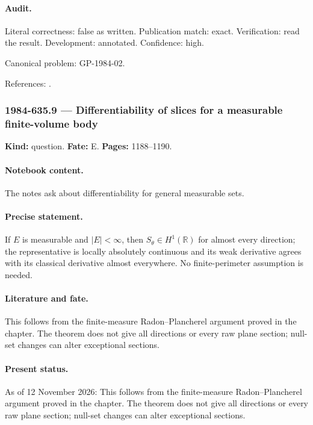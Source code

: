 \paragraph{Audit.} Literal correctness: false as written. Publication match: exact. Verification: read the result. Development: annotated. Confidence: high.

\noindent Canonical problem: GP-1984-02.\par

\noindent References: \citep{gelfandgraevvilenkin1966integral}.\par

\subsubsection{1984-635.9 --- Differentiability of slices for a measurable finite-volume body}

\label{item:1984-635.9}

\noindent\textbf{Kind:} question. \textbf{Fate:} E. \textbf{Pages:} 1188--1190.\par

\paragraph{Notebook content.} The notes ask about differentiability for general measurable sets.

\paragraph{Precise statement.} If \(E\) is measurable and \(|E|<\infty\), then \(S_\theta\in H^1(\mathbb R)\) for almost every direction; the representative is locally absolutely continuous and its weak derivative agrees with its classical derivative almost everywhere. No finite-perimeter assumption is needed.

\paragraph{Literature and fate.} This follows from the finite-measure Radon--Plancherel argument proved in the chapter. The theorem does not give all directions or every raw plane section; null-set changes can alter exceptional sections.

\paragraph{Present status.} As of 12 November 2026: This follows from the finite-measure Radon--Plancherel argument proved in the chapter. The theorem does not give all directions or every raw plane section; null-set changes can alter exceptional sections.

